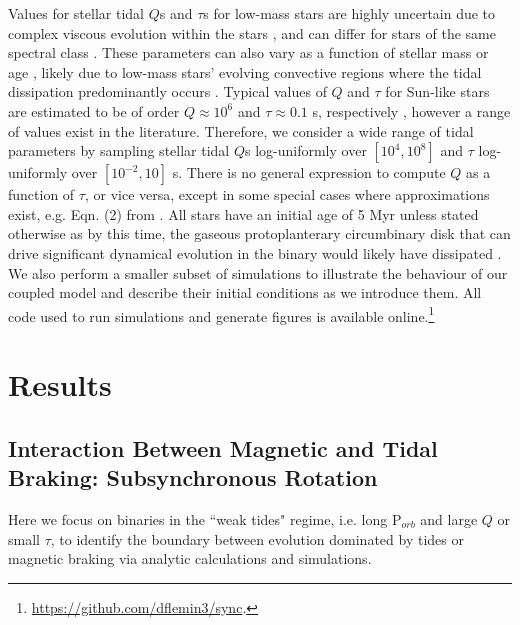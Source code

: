 Values for stellar tidal $Q$s and $\tau$s for low-mass stars are highly uncertain due to complex viscous evolution within the stars \citep{Ogilvie2007}, and can differ for stars of the same spectral class \citep{Barker2009}. These parameters can also vary as a function of stellar mass or age \citep{Bolmont2016,vanEylen2016}, likely due to low-mass stars' evolving convective regions where the tidal dissipation predominantly occurs \citep{Zahn2008}. Typical values of $Q$ and $\tau$ for Sun-like stars are estimated to be of order $Q \approx 10^6$ and $\tau \approx 0.1$ s, respectively \citep[e.g.][]{Meibom2005,Ogilvie2007,Jackson2008}, however a range of values exist in the literature.  Therefore, we consider a wide range of tidal parameters by sampling stellar tidal $Q$s log-uniformly over $[10^4,10^8]$ and $\tau$ log-uniformly over $[10^{-2},10]$ s.  There is no general expression to compute $Q$ as a function of $\tau$, or vice versa, except in some special cases where approximations exist, e.g. Eqn. (2) from \citet{Heller2011}. All stars have an initial age of 5 Myr unless stated otherwise as by this time, the gaseous protoplanterary circumbinary disk that can drive significant dynamical evolution in the binary \citep[e.g.][]{Fleming2017} would likely have dissipated \citep{Haisch2001}. We also perform a smaller subset of simulations to illustrate the behaviour of our coupled model and describe their initial conditions as we introduce them. All code used to run simulations and generate figures is available online.\footnote{\href{https://github.com/dflemin3/sync}{https://github.com/dflemin3/sync}.}



\section{Results} \label{sync:sec:results}

\subsection{Interaction Between Magnetic and Tidal Braking: Subsynchronous Rotation} \label{sync:sec:eq}

Here we focus on binaries in the ``weak tides" regime, i.e. long P$_{orb}$ and large $Q$ or small $\tau$, to identify the boundary between evolution dominated by tides or magnetic braking via analytic calculations and simulations.  

